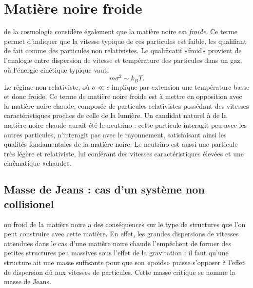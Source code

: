 \section{Matière noire froide}

 de la cosmologie considère également que la matière noire est \textit{froide}. Ce terme permet d'indiquer que la vitesse typique de ces particules est faible, les qualifiant de fait comme des particules non relativistes. Le qualificatif «froid» provient de l'analogie entre dispersion de vitesse et température des particules dans un gaz, où l'énergie cinétique typique vaut:
\begin{equation}
m\sigma^2 \sim k_B T.
\end{equation}
Le régime non relativiste, où $\sigma \ll c$ implique par extension une température basse et donc froide. Ce terme de matière noire froide est à mettre en opposition avec la matière noire chaude, composée de particules relativistes possédant des vitesses caractéristiques proches de celle de la lumière. Un candidat naturel à de la matière noire chaude aurait été le neutrino : cette particule interagit peu avec les autres particules, n'interagit pas avec le rayonnement, satisfaisant ainsi les qualités fondamentales de la matière noire. Le neutrino est aussi une particule très légère et relativiste, lui conférant des vitesses caractéristiques élevées et une cinématique «chaude».

\subsection{Masse de Jeans : cas d'un système non collisionel}
 ou froid de la matière noire a des conséquences sur le type de structures que l'on peut construire avec cette matière. En effet, les grandes dispersions de vitesses attendues dans le cas d'une matière noire chaude l'empêchent de former des petites structures peu massives sous l'effet de la gravitation : il faut qu'une structure ait une masse suffisante pour que son «poids» puisse s'opposer à l'effet de dispersion dû aux vitesses de particules. Cette masse critique se nomme la masse de Jeans.

